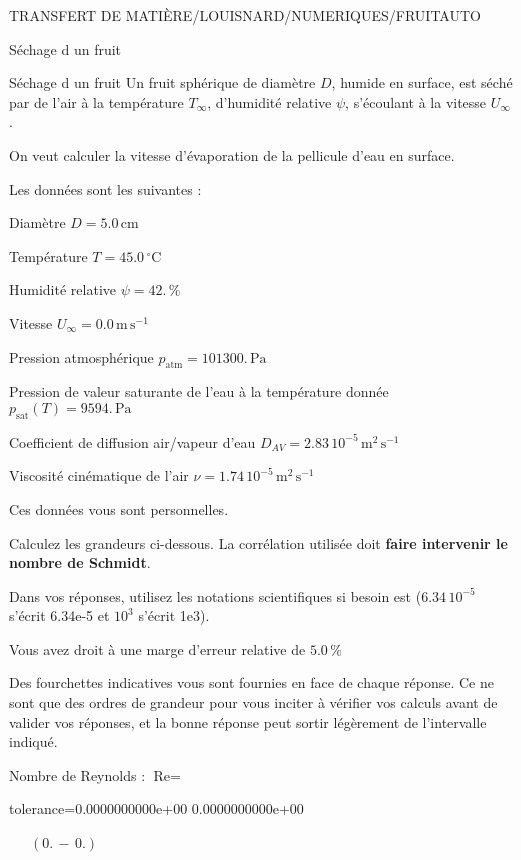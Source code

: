\documentclass[12pt]{article}
\begin{document}
\begin{quiz}{TRANSFERT DE MATIÈRE/LOUISNARD/NUMERIQUES/FRUITAUTO}
\begin{cloze}{Séchage d un fruit}
\end{cloze} 


 \begin{cloze}{Séchage d un fruit} 
Un fruit sphérique de diamètre $D$, humide en surface, est séché par de l'air à la température $T_\infty$, d'humidité relative $\psi$, s'écoulant à la vitesse $U_\infty$.

On veut calculer la vitesse d'évaporation de la pellicule d'eau en surface.

 

Les données sont les suivantes :

 

Diamètre $D = 5.0\,  \mathrm{cm} $

Température $T = 45.0\,  \mathrm{^\circ\mathrm{C}} $

Humidité relative $\psi = 42.\, \% $

Vitesse $U_\infty = 0.0\,  \mathrm{m}\,  \mathrm{s}^{-1} $

Pression atmosphérique $p_{\text{atm}} = 101300.\,  \mathrm{Pa} $

Pression de valeur saturante de l’eau à la température donnée $p_{\text{sat}}(T) = 9594.\,  \mathrm{Pa} $

Coefficient de diffusion air/vapeur d’eau $D_{AV} =  2.83 \, 10^{-5} \,  \mathrm{m}^{2}\,  \mathrm{s}^{-1} $

Viscosité cinématique de l’air $\nu =  1.74 \, 10^{-5} \,  \mathrm{m}^{2}\,  \mathrm{s}^{-1} $

Ces données vous sont personnelles.

 

Calculez les grandeurs ci-dessous. La corrélation utilisée doit \textbf{faire intervenir le nombre de Schmidt}.

Dans vos réponses, utilisez les notations scientifiques si besoin est ($6.34\, 10^{-5}$ s'écrit 6.34e-5 et $10^{3}$ s'écrit 1e3).

Vous avez droit à une marge d'erreur relative de $5.0\, \% $

Des fourchettes indicatives vous sont fournies en face de chaque réponse. Ce ne sont que des ordres de grandeur pour vous inciter à vérifier vos calculs avant de valider vos réponses, et la bonne réponse peut sortir légèrement de l'intervalle indiqué.

 

Nombre de Reynolds : $\text{Re} =  $
\begin{numerical}[points=1] 
\item[tolerance={0.0000000000e+00}] 0.0000000000e+00 
\end{numerical} 
 $\,$ 
 $ \quad (0. \, - \, 0.) $ 


\end{cloze}
\end{quiz}
\end{document}
